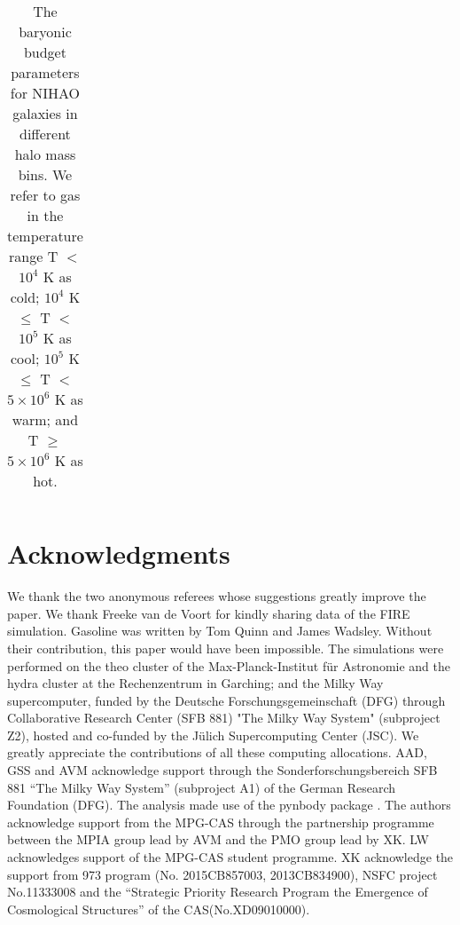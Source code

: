 \documentclass[useAMS,usenatbib]{mn2e}
\begin{document}
\begin{table*}
  \caption{The baryonic budget parameters for NIHAO galaxies
    in different halo  mass bins. We refer to gas in the temperature range  T
  $<$ $10^4$ K as cold; $10^4$ K $\leqslant$ T $<$ $10^5$ K as cool;
  $10^5$ K $\leqslant$ T $<$ $5\times10^6$ K as warm;  and T $\geqslant$
  $5\times10^6$ K as hot.}
\begin{center}
\begin{tabular}{ccccc}
\hline

\hline
\end{tabular}
\label{tab:comparison}
\end{center}
\end{table*}





\section*{Acknowledgments} 

We thank the two anonymous referees whose suggestions greatly  improve
the paper.  We thank Freeke van de Voort for kindly sharing data
  of the FIRE simulation.  {\sc Gasoline} was written by Tom Quinn
and James Wadsley. Without their contribution, this paper would have
been impossible.
%
The simulations were performed on the {\sc theo} cluster of the
Max-Planck-Institut f\"ur Astronomie and the {\sc hydra} cluster at
the Rechenzentrum in Garching; and the Milky Way supercomputer, funded
by the Deutsche Forschungsgemeinschaft (DFG) through Collaborative
Research Center (SFB 881) "The Milky Way System" (subproject Z2),
hosted and co-funded by the J\"ulich Supercomputing Center (JSC). We
greatly appreciate the contributions of all these computing
allocations.
%
AAD, GSS and AVM acknowledge support through the
Sonderforschungsbereich SFB 881 “The Milky Way System” (subproject A1)
of the German Research Foundation (DFG).  The analysis made use of the
pynbody package \citep{Pontzen13}.
%
The authors acknowledge support from the MPG-CAS through the
partnership programme between the MPIA group lead by AVM and the PMO
group lead by XK.
%
LW acknowledges support of the MPG-CAS student programme.
%
XK acknowledge the support from 973 program (No. 2015CB857003,
2013CB834900), NSFC project No.11333008 and the ``Strategic Priority
Research Program the Emergence of Cosmological Structures'' of the
CAS(No.XD09010000).


\end{document}
